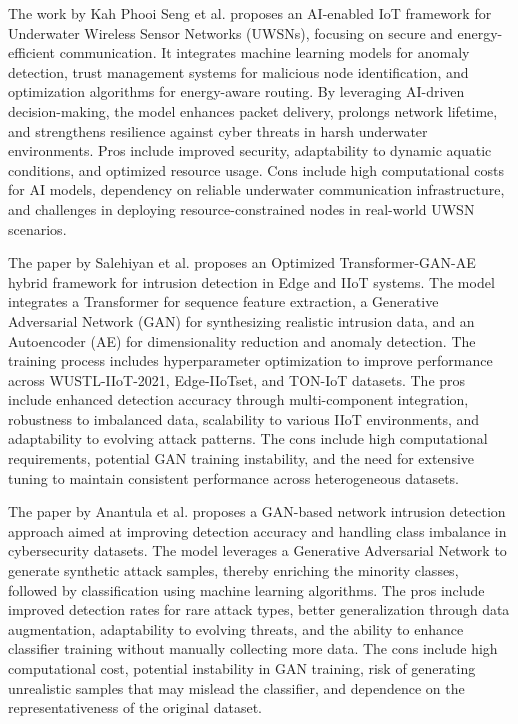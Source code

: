 \documentclass[a4paper,fleqn]{cas-dc}
\numberwithin{equation}{section}
\begin{document}
The work by Kah Phooi Seng et al.\cite{seng2022artificial} proposes an AI-enabled IoT framework for Underwater Wireless Sensor Networks (UWSNs), focusing on secure and energy-efficient communication. It integrates machine learning models for anomaly detection, trust management systems for malicious node identification, and optimization algorithms for energy-aware routing. By leveraging AI-driven decision-making, the model enhances packet delivery, prolongs network lifetime, and strengthens resilience against cyber threats in harsh underwater environments. Pros include improved security, adaptability to dynamic aquatic conditions, and optimized resource usage. Cons include high computational costs for AI models, dependency on reliable underwater communication infrastructure, and challenges in deploying resource-constrained nodes in real-world UWSN scenarios.

The paper by Salehiyan et al.\cite{Salehiyan2025} proposes an Optimized Transformer-GAN-AE hybrid framework for intrusion detection in Edge and IIoT systems. The model integrates a Transformer for sequence feature extraction, a Generative Adversarial Network (GAN) for synthesizing realistic intrusion data, and an Autoencoder (AE) for dimensionality reduction and anomaly detection. The training process includes hyperparameter optimization to improve performance across WUSTL-IIoT-2021, Edge-IIoTset, and TON-IoT datasets. The pros include enhanced detection accuracy through multi-component integration, robustness to imbalanced data, scalability to various IIoT environments, and adaptability to evolving attack patterns. The cons include high computational requirements, potential GAN training instability, and the need for extensive tuning to maintain consistent performance across heterogeneous datasets.

The paper by Anantula et al.\cite{Anantula20255162} proposes a GAN-based network intrusion detection approach aimed at improving detection accuracy and handling class imbalance in cybersecurity datasets. The model leverages a Generative Adversarial Network to generate synthetic attack samples, thereby enriching the minority classes, followed by classification using machine learning algorithms. The pros include improved detection rates for rare attack types, better generalization through data augmentation, adaptability to evolving threats, and the ability to enhance classifier training without manually collecting more data. The cons include high computational cost, potential instability in GAN training, risk of generating unrealistic samples that may mislead the classifier, and dependence on the representativeness of the original dataset.
\end{document}
